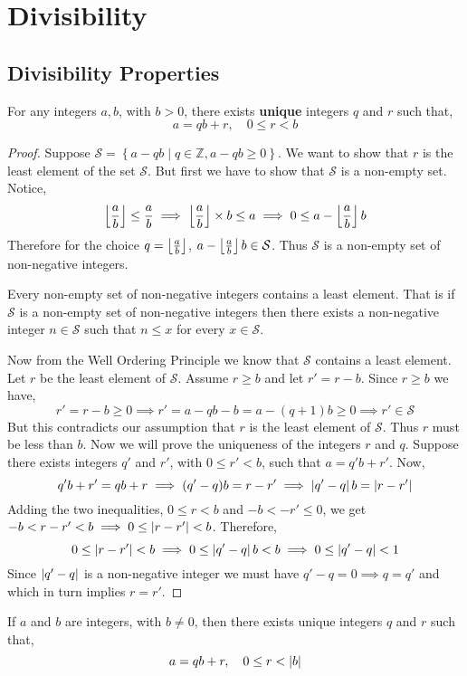 \chapter{Divisibility}
\section{Divisibility Properties}

\begin{theorem}
    For any integers $a,b$, with $b>0$, there exists \textbf{unique} integers 
    $q$ and $r$ such that,
    \[
        a = qb + r, \quad 0 \leq r < b
    \]
\end{theorem}
\begin{proof}
    Suppose $\mathcal{S} = \left\{ a-qb \mid q \in \mathbb{Z}, a-qb \geq 0 \right\}$. 
    We want to show that $r$ is the least element of the set $\mathcal{S}$. 
    But first we have to show that $\mathcal{S}$ is a non-empty set. Notice, 
    \[
    \left\lfloor \frac{a}{b} \right\rfloor \leq \frac{a}{b} 
    \implies \left\lfloor \frac{a}{b} \right\rfloor \times b \leq a 
    \implies 0 \leq a - \left\lfloor \frac{a}{b} \right\rfloor b
    \]
    Therefore for the choice $q = \left\lfloor \frac{a}{b} \right\rfloor$, $a - \left\lfloor \frac{a}{b} \right\rfloor b \in \mathcal{S}$. 
    Thus $\mathcal{S}$ is a non-empty set of non-negative integers.
    \begin{theorem*}
        Every non-empty set of non-negative integers contains a least element. 
        That is if $\mathcal{S}$ is a non-empty set of non-negative integers then 
        there exists a non-negative integer $n \in \mathcal{S}$ such that 
        $n \leq x$ for every $x \in \mathcal{S}$.
    \end{theorem*}
    Now from the Well Ordering Principle we know that $\mathcal{S}$ contains a least element. 
    Let $r$ be the least element of $\mathcal{S}$. Assume $r \geq b$ and let $r' = r - b$. 
    Since $r \geq b$ we have,
    \[
        r' = r - b \geq 0 
        \implies r' = a - qb - b = a - (q+1)b \geq 0 
        \implies r' \in \mathcal{S}
    \]
    But this contradicts our assumption that $r$ is the least element of $\mathcal{S}$. 
    Thus $r$ must be less than $b$. Now we will prove the uniqueness of the integers $r$ and $q$. 
    Suppose there exists integers $q'$ and $r'$, with $0\leq r' < b$, such that $a = q'b + r'$. Now, 
    \[
        q'b + r' = qb + r 
        \implies (q' - q)b = r - r' 
        \implies \left\lvert q' - q \right\rvert b = \left\lvert r - r' \right\rvert
    \]
    Adding the two inequalities, $0 \leq r < b$ and $-b < -r' \leq 0$, 
    we get $-b < r - r' < b \implies 0 \leq \left\lvert r-r' \right\rvert < b$. Therefore,
    \[
    0 \leq \left\lvert r-r' \right\rvert < b 
    \implies 0\leq \left\lvert q' - q \right\rvert b < b 
    \implies 0\leq \left\lvert q' - q \right\rvert < 1
    \]
    Since $\left\lvert q' - q \right\rvert$ is a non-negative integer we must have $q' - q=0 \implies q= q'$ 
    and which in turn implies $r=r'$.
\end{proof}
\begin{corollary}
    If $a$ and $b$ are integers, with $b\neq 0$, then there exists unique integers $q$ and $r$ such that,
    \[
        a = qb + r, \quad 0\leq r < \left\lvert b \right\rvert
    \]
\end{corollary}
